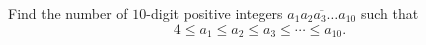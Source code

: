 Find the number of $10$-digit positive integers $\overline{a_1a_2a_3\ldots a_{10}}$ such that
\[4\le a_1\le a_2\le a_3\le\cdots\le a_{10}.\]
